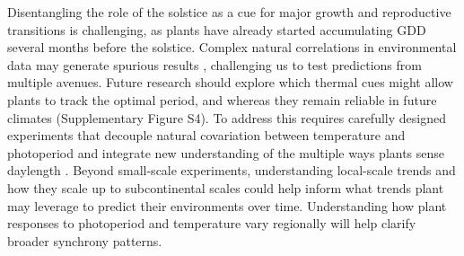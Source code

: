 \documentclass[11pt,letter]{article}
\begin{document}
Disentangling the role of the solstice as a cue for major growth and reproductive transitions is challenging, as plants have already started accumulating GDD several months before the solstice.
Complex natural correlations in environmental data may generate spurious results \citep[e.g.][]{Gao2024}, challenging us to test predictions from multiple avenues. %
Future research should explore which thermal cues might allow plants to track the optimal period, and whereas they remain reliable in future climates (Supplementary Figure S4).
To address this requires carefully designed experiments that decouple natural covariation between temperature and photoperiod  \citep{Buonaiuto2023} and integrate new understanding of the multiple ways plants sense daylength \citep{wang2024plants}.  
Beyond small-scale experiments, understanding local-scale trends and how they scale up to subcontinental scales could help inform what trends plant may leverage to predict their environments over time. Understanding how plant responses to photoperiod and temperature vary regionally will help clarify broader synchrony patterns.
\end{document}
